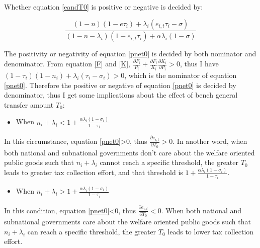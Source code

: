 Whether equation \ref{eandT0} is positive or negative is decided by:

\begin{equation}
    \frac{(1-n) (1-e \tau_i)+\lambda_i(e_{i,t} \tau_i -\sigma )}{(1-n-\lambda_i)(1-e_{i,t}\tau_i)+\alpha \lambda_i(1-\sigma)} \label{pnet0}
\end{equation}

The positivity or negativity of equation \ref{pnet0} is decided by both nominator and denominator. From equation \ref{F} and \ref{K}, $\frac{\partial F_i}{P_i}+\frac{\partial F_i}{K_i}\frac{\partial K_i}{\partial P_i}>0$, thus I have $(1-\tau_i)(1-n_i)+\lambda_i(\tau_i-\sigma_i)>0$, which is the nominator of equation \ref{pnet0}. Therefore the positive or negative of equation \ref{pnet0} is decided by denominator, thus I get some implications about the effect of bench general transfer amount $T_0$:

\begin{itemize}
    \item When $n_i+\lambda_i<1+\frac{\alpha \lambda_i(1-\sigma_i)}{1-\tau_i}$
\end{itemize}

In this circumstance, equation \ref{pnet0}>$0$, thus $\frac{\partial e_{i,t}}{\partial T_0}>0$. In another word, when both national and subnational governments don't care about the welfare oriented public goods such that $n_i+\lambda_i$ cannot reach a specific threshold, the greater $T_0$ leads to greater tax collection effort, and that threshold is $1+\frac{\alpha \lambda_i(1-\sigma_i)}{1-\tau_i}$.

\begin{itemize}
    \item When $n_i+\lambda_i>1+\frac{\alpha \lambda_i(1-\sigma_i)}{1-\tau_i}$
\end{itemize}

In this condition, equation \ref{pnet0}<$0$, thus $\frac{\partial e_{i,t}}{\partial T_0}<0$. When both national and subnational governments care about the welfare oriented public goods such that $n_i+\lambda_i$ can reach a specific threshold, the greater $T_0$ leads to lower tax collection effort.

